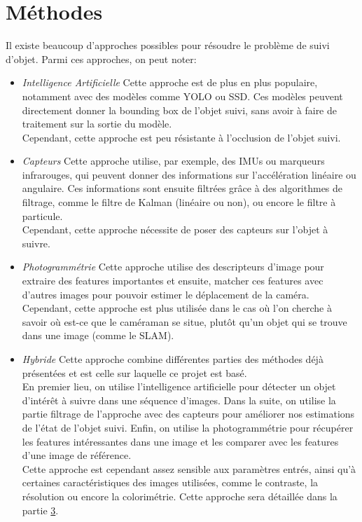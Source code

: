 \section{Méthodes}
Il existe beaucoup d'approches possibles pour résoudre le problème de suivi d'objet. Parmi ces approches, on peut noter:\\
\begin{itemize}
	\item \textit{Intelligence Artificielle}\newline
	Cette approche est de plus en plus populaire, notamment avec des modèles comme YOLO\cite{redmon_you_2016} ou SSD\cite{liu_ssd_2016}. Ces modèles peuvent directement donner la bounding box de l'objet suivi, sans avoir à faire de traitement sur la sortie du modèle.\\
	Cependant, cette approche est peu résistante à l'occlusion de l'objet suivi.\\
	
	\item \textit{Capteurs}\newline
	Cette approche utilise, par exemple, des IMUs ou marqueurs infrarouges, qui peuvent donner des informations sur l'accélération linéaire ou angulaire. Ces informations sont ensuite filtrées grâce à des algorithmes de filtrage, comme le filtre de Kalman (linéaire ou non), ou encore le filtre à particule.\\
	Cependant, cette approche nécessite de poser des capteurs sur l'objet à suivre.\\
	
	\item \textit{Photogrammétrie}\newline
	Cette approche utilise des descripteurs d'image pour extraire des features importantes et ensuite, matcher ces features avec d'autres images pour pouvoir estimer le déplacement de la caméra.\\
	Cependant, cette approche est plus utilisée dans le cas où l'on cherche à savoir où est-ce que le caméraman se situe, plutôt qu'un objet qui se trouve dans une image (comme le SLAM).\\
	
	\item \textit{Hybride}\newline
	Cette approche combine différentes parties des méthodes déjà présentées et est celle sur laquelle ce projet est basé.\\
	En premier lieu, on utilise l'intelligence artificielle pour détecter un objet d'intérêt à suivre dans une séquence d'images. Dans la suite, on utilise la partie filtrage de l'approche avec des capteurs pour améliorer nos estimations de l'état de l'objet suivi. Enfin, on utilise la photogrammétrie pour récupérer les features intéressantes dans une image et les comparer avec les features d'une image de référence.\\
	Cette approche est cependant assez sensible aux paramètres entrés, ainsi qu'à certaines caractéristiques des images utilisées, comme le contraste, la résolution ou encore la colorimétrie.
	Cette approche sera détaillée dans la partie \hyperlink{chapter.3}{3}.\\
\end{itemize}
